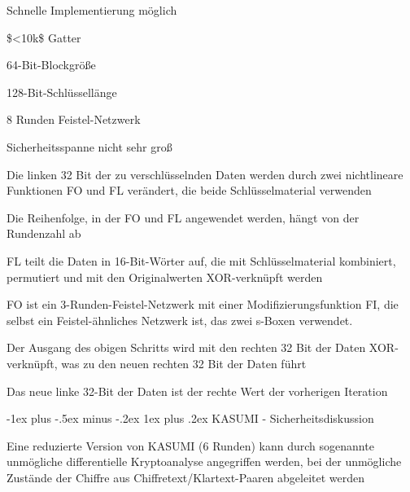\documentclass[a4paper]{article}
\makeatletter
\renewcommand{\subsubsection}{\@startsection{subsubsection}{3}{0mm}%
 {-1ex plus -.5ex minus -.2ex}%
 {1ex plus .2ex}%
 {\normalfont\small\bfseries}}
\makeatother
\begin{document}
\begin{multicols}{3}
\begin{itemize*}
            \begin{itemize*}
                  \item Schnelle Implementierung möglich
                  \item \$\textless10k\$ Gatter
            \end{itemize*}
            \item
            64-Bit-Blockgröße
            \item
            128-Bit-Schlüssellänge
            \item
            8 Runden Feistel-Netzwerk
            \item
            Sicherheitsspanne nicht sehr groß
      \end{itemize*}


      \begin{itemize*}
            \item
            Die linken 32 Bit der zu verschlüsselnden Daten werden durch zwei
            nichtlineare Funktionen FO und FL verändert, die beide
            Schlüsselmaterial verwenden
            \item
            Die Reihenfolge, in der FO und FL angewendet werden, hängt von der
            Rundenzahl ab
            \item
            FL teilt die Daten in 16-Bit-Wörter auf, die mit Schlüsselmaterial
            kombiniert, permutiert und mit den Originalwerten XOR-verknüpft werden
            \item
            FO ist ein 3-Runden-Feistel-Netzwerk mit einer Modifizierungsfunktion
            FI, die selbst ein Feistel-ähnliches Netzwerk ist, das zwei s-Boxen
            verwendet.
            \item
            Der Ausgang des obigen Schritts wird mit den rechten 32 Bit der Daten
            XOR-verknüpft, was zu den neuen rechten 32 Bit der Daten führt
            \item
            Das neue linke 32-Bit der Daten ist der rechte Wert der vorherigen
            Iteration
      \end{itemize*}


      \subsubsection{KASUMI -
            Sicherheitsdiskussion}

      \begin{itemize*}
            \item
            Eine reduzierte Version von KASUMI (6 Runden) kann durch sogenannte
            unmögliche differentielle Kryptoanalyse angegriffen werden, bei der
            unmögliche Zustände der Chiffre aus Chiffretext/Klartext-Paaren
            abgeleitet werden


\end{itemize*}
\end{multicols}
\end{document}
